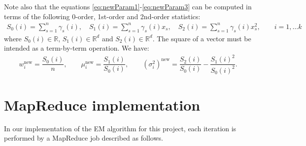 \documentclass[a4paper,10pt]{article}
\begin{document}
Note also that the equations \ref{eq:newParam1}-\ref{eq:newParam3} can be computed in terms of the following 0-order, 1st-order and 2nd-order statistics:
\begin{align*}
S_0(i)=\sum_{s=1}^n \gamma_s(i), \quad
S_1(i) =\sum_{s=1}^n\gamma_s(i) x_s, \quad
S_2 (i) =\sum_{s=1}^n \gamma_s(i)  x_s^2, \qquad i=1, \dots k
\end{align*}
where $S_0(i) \in \mathbb{R}$, $S_1(i) \in \mathbb{R}^d$ and $S_2(i) \in \mathbb{R}^d$. The square of a vector must be intended as a term-by-term operation.
We have:
\begin{align}
w_i^{\text{new}}=\dfrac{S_0(i)}{n}, \qquad
\mu_i^{\text{new}}=\dfrac{S_1(i)}{S_0(i)},  \qquad
(\sigma^2_i)^{\text{new}}=%
\dfrac{S_2(i)}{S_0(i)}-\dfrac{S_1(i)^2}{S_0(i)^2} .
\end{align}

%
\section{MapReduce implementation}
In our implementation of the EM algorithm for this project, each iteration is performed by a MapReduce job described as follows.
\end{document}
